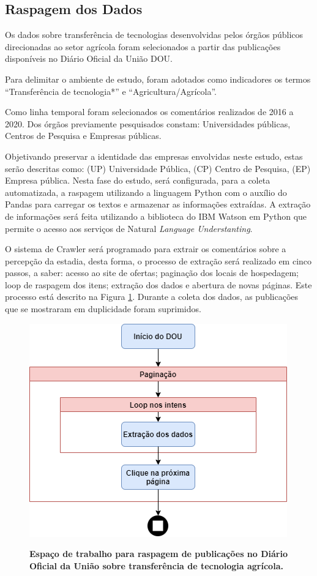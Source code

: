 \subsection{Raspagem dos Dados}

Os dados sobre transferência de tecnologias desenvolvidas pelos órgãos públicos direcionadas ao setor agrícola foram selecionados a partir das publicações disponíveis no Diário Oficial da União DOU.

Para delimitar o ambiente de estudo, foram adotados como indicadores os termos “Transferência de tecnologia*” e “Agricultura/Agrícola”. 

Como linha temporal foram selecionados os comentários realizados de 2016 a 2020. Dos órgãos previamente pesquisados  constam: Universidades públicas, Centros de Pesquisa e Empresas públicas.

Objetivando preservar a identidade das empresas envolvidas neste estudo, estas serão descritas como: (UP) Universidade Pública, (CP) Centro de Pesquisa, (EP) Empresa pública. Nesta fase do  estudo, será configurada, para a coleta automatizada, a raspagem utilizando a linguagem Python com o auxílio do Pandas para carregar os textos e armazenar as informações extraídas. A extração de informações será feita utilizando a biblioteca do IBM Watson em Python que permite o acesso aos serviços de Natural \textit{Language Understanting}.

O sistema de Crawler será programado para extrair os comentários sobre a percepção da estadia, desta forma, o processo de extração será realizado em cinco passos, a saber: acesso ao site de ofertas; paginação dos locais de hospedagem; loop de raspagem dos itens; extração dos dados e abertura de novas páginas. Este processo está descrito na Figura \ref{figura_raspagem}. Durante a coleta dos dados, as publicações que se mostraram em duplicidade foram suprimidos. 



\begin{figure}[H]
\centering
\caption{\textbf{Espaço de trabalho para raspagem de publicações no Diário Oficial da União sobre transferência de tecnologia agrícola.
}}
\includegraphics[scale=0.6]{Imagens/raspagem.png}
\label{figura_raspagem}
\end{figure}


